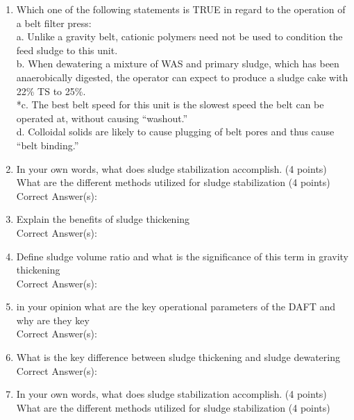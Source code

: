 \documentclass{article}
\begin{document}
\begin{enumerate}
\item  Which one of the following statements is TRUE in regard to the operation of a belt filter press: \\

a. Unlike a gravity belt, cationic polymers need not be used to condition the feed sludge to this unit. \\
b. When dewatering a mixture of WAS and primary sludge, which has been anaerobically digested, the operator can expect to produce a sludge cake with 22\% TS to 25\%. \\
*c. The best belt speed for this unit is the slowest speed the belt can be operated at, without causing “washout.” \\
d. Colloidal solids are likely to cause plugging of belt pores and thus cause “belt binding.” \\

\item  In your own words, what does sludge stabilization accomplish. (4 points)\\
What are the different methods utilized for sludge stabilization (4 points)\\

Correct Answer(s): \\

\item  Explain the benefits of sludge thickening \\

Correct Answer(s): \\

\item  Define sludge volume ratio and what is the significance of this term in gravity thickening \\

Correct Answer(s): \\

\item  in your opinion what are the key operational parameters of the DAFT and why are they key \\

Correct Answer(s): \\

\item  What is the key difference between sludge thickening and sludge dewatering \\

Correct Answer(s): \\

\item  In your own words, what does sludge stabilization accomplish. (4 points)\\
What are the different methods utilized for sludge stabilization (4 points)\\


\end{enumerate}
\end{document}
